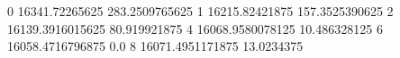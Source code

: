 0 16341.72265625 283.2509765625
1 16215.82421875 157.3525390625
2 16139.3916015625 80.919921875
4 16068.9580078125 10.486328125
6 16058.4716796875 0.0
8 16071.4951171875 13.0234375
